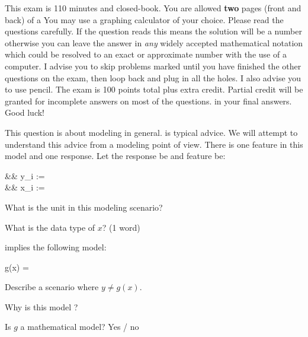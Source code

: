 \documentclass[12pt]{article}
\begin{document}
This exam is 110 minutes and closed-book. You are allowed \textbf{two} pages (front and back) of a  You may use a graphing calculator of your choice. Please read the questions carefully. If the question reads  this means the solution will be a number otherwise you can leave the answer in \textit{any} widely accepted mathematical notation which could be resolved to an exact or approximate number with the use of a computer. I advise you to skip problems marked  until you have finished the other questions on the exam, then loop back and plug in all the holes. I also advise you to use pencil. The exam is 100 points total plus extra credit. Partial credit will be granted for incomplete answers on most of the questions.  in your final answers. Good luck!

\pagebreak

\problem This question is about modeling in general.  is typical advice. We will attempt to understand this advice from a modeling point of view. There is one feature in this model and one response. Let the response be and feature be:

\beqn
&& y_i :=  \\
&& x_i  :=  \\
\eeqn

\benum

  What is the unit in this modeling scenario? 

  What is the data type of $x$? (1 word) 

   implies the following model:\vspace{-0.5cm}

\beqn
\hspace{-4cm}g(x) = 
\eeqn~\vspace{-0.5cm}

  Describe a scenario where $y \neq g(x)$. 

  Why is this model ? 

  Is $g$ a mathematical model? Yes / no 
\eenum
\end{document}
